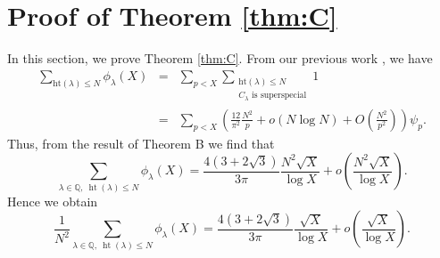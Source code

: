 \documentclass[a4paper, 11pt]{article}
\theoremstyle{plain}
\newcommand{\?}{\textcolor{red}{??}}
\newcommand{\lm}{\lambda}
\newcommand{\bQ}{\mathbb{Q}}
\newcommand{\height}{\operatorname{ht}}
\begin{document}
\section{Proof of Theorem \ref{thm:C}}
\label{pfofc}
In this section, we prove Theorem \ref{thm:C}.  From our previous work \cite[\S 6]{Ando}, we have
\begin{eqnarray*}
    \sum_{\text{ht}(\lm) \le N} {\phi}_{\lm}(X) &=& 
\sum_{p < X} \sum_{\substack{\text{ht}(\lm) \le N \\ C_{\lm} \text{ is superspecial} }} 1\\
&=& \sum_{p < X} \left(  \frac{12}{{\pi}^2} \frac{N^2}{p} + o(N\log N) +O\left( \frac{N^2}{p^2} \right) \right) {\psi}_p.
\end{eqnarray*}
Thus, from the result of Theorem B we find that
\[
\sum_{\lm \in \bQ,\ \height(\lm) \le N } {\phi}_{\lm}(X) = \frac{4(3+2\sqrt{3})}{3\pi} \frac{N^2\sqrt{X}}{\log X} +o \left( \frac{N^2\sqrt{X}}{\log X}\right).
\]
Hence we obtain
 \[
    \frac{1}{N^2}\sum_{\lm \in \bQ,\ \height(\lm) \le N } {\phi}_{\lm}(X) = \frac{4(3+2\sqrt{3})}{3\pi} \frac{\sqrt{X}}{\log X} +o \left( \frac{\sqrt{X}}{\log X}\right).
 \]
\end{document}
